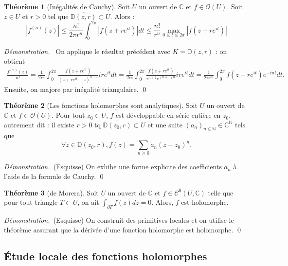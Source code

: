 \documentclass[11pt,a4paper]{article}
\newcommand{\N}{\mathbb{N}}
\newcommand{\D}{\mathbb{D}}
\newcommand{\C}{\mathbb{C}}
\newcommand\abs[1]{\left|#1\right|}
\theoremstyle{definition}
\newtheorem{theoreme}{Th\'eor\`eme}[section]
\renewenvironment{proof}{\color{preuve}\emph{Démonstration.~}}{\qed\vspace{1em}}
\theoremstyle{plain}
\begin{document}
\begin{theoreme}[Inégalités de Cauchy]
Soit $U$ un ouvert de $\C$ et $f\in \mathcal O(U)$.
Soit $z\in U$ et $r>0$ tel que $\overline{\D(z,r)} \subset U$.
Alors :
\[ \abs{f^{(n)}(z)} \leq \frac{n!}{2\pi  r^n} \int_0^{2\pi} |f(z+re^{it})|dt
\leq \frac{n!}{r^n}\max_{0\leq t\leq 2\pi} \abs{f(z+re^{it})}\]
\end{theoreme}
\begin{proof}
On applique le résultat précédent avec $K = \overline{\D(z,r)}$ : on obtient
\begin{align*}
\frac{f^{(n)}(z)}{n!}
= \frac{1}{2i\pi}\int_0^{2\pi} \frac{f\left(z+re^{it}\right)}{(z+re^{it}-z)^{n+1}}ire^{it}dt
= \frac{1}{2i\pi}\int_0^{2\pi} \frac{f\left(z+re^{it}\right)}{r^{n+1}e^{(n+1)it}}ire^{it}dt
= \frac{1}{2\pi r^n}\int_0^{2\pi} f\left(z+re^{it}\right)e^{-int}dt.
\end{align*}
Ensuite, on majore par inégalité triangulaire.
\end{proof}

\begin{theoreme}[Les fonctions holomorphes sont analytiques]
Soit $U$ un ouvert de $\C$ et $f\in \mathcal O(U)$.
Pour tout $z_0\in U$, $f$ est développable en série entière en $z_0$, autrement dit : il existe $r>0$ tq $\overline{\D(z_0,r)}\subset U$ et une suite $(a_n)_{n\in\N} \in \C^\N$ tels que
\[ \forall z\in \D(z_0,r), f(z) = \sum_{n\geq 0}a_n(z-z_0)^n.\]
\end{theoreme}

\begin{proof}(Esquisse)
On exhibe  une forme explicite des coefficients $a_n$ à l'aide de la formule de Cauchy.
\end{proof}



\begin{theoreme}[de Morera]
Soit $U$ un ouvert de $\C$ et $f\in \mathcal C^0(U,\C)$ telle que pour tout triangle $T\subset U$, on ait $\int_{\partial T}f(z)dz=0$.
Alors, $f$ est holomorphe.
\end{theoreme}

\begin{proof}(Esquisse) On construit des primitives locales et on utilise le théorème assurant que la dérivée d'une fonction holomorphe est holomorphe.
\end{proof}

 

\subsection{Étude locale des fonctions holomorphes}
\end{document}
